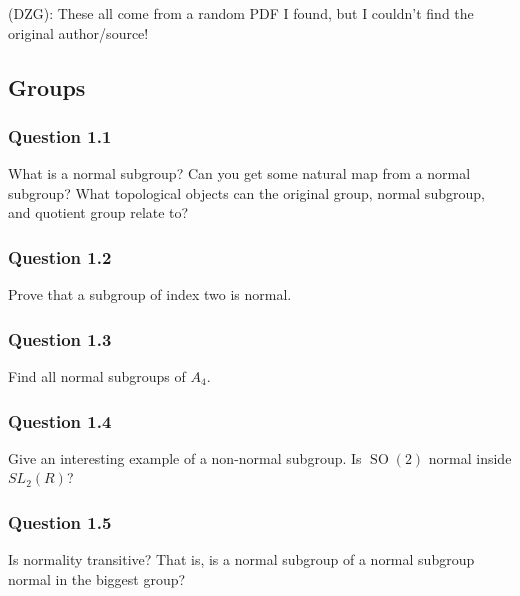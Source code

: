 \begin{remark}

(DZG): These all come from a random PDF I found, but I couldn't find the
original author/source!

\end{remark}

\hypertarget{groups}{%
\subsection{Groups}\label{groups}}

\hypertarget{question-1.1}{%
\subsubsection{Question 1.1}\label{question-1.1}}

What is a normal subgroup? Can you get some natural map from a normal
subgroup? What topological objects can the original group, normal
subgroup, and quotient group relate to?

\hypertarget{question-1.2}{%
\subsubsection{Question 1.2}\label{question-1.2}}

Prove that a subgroup of index two is normal.

\hypertarget{question-1.3}{%
\subsubsection{Question 1.3}\label{question-1.3}}

Find all normal subgroups of \(A_4\).

\hypertarget{question-1.4}{%
\subsubsection{Question 1.4}\label{question-1.4}}

Give an interesting example of a non-normal subgroup. Is
\({\operatorname{SO}}(2)\) normal inside \(SL_2(R)\)?

\hypertarget{question-1.5}{%
\subsubsection{Question 1.5}\label{question-1.5}}

Is normality transitive? That is, is a normal subgroup of a normal
subgroup normal in the biggest group?


